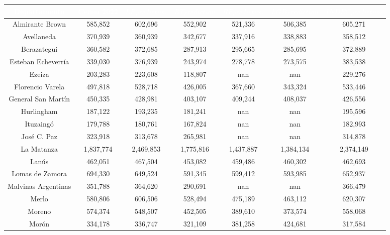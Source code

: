 \begin{table}[htb]
\centering
\begin{tabular}{|c|c|c|c|c|c|c|}
\hline
\textbf{\cellcolor[rgb]{0,0.231,0.427}\textcolor{white}{Departamento}} & \textbf{\cellcolor[rgb]{0,0.231,0.427}\textcolor{white}{Censo 2022}} & \textbf{\cellcolor[rgb]{0,0.231,0.427}\textcolor{white}{$LR_Prediction$}} & \textbf{\cellcolor[rgb]{0,0.231,0.427}\textcolor{white}{$RT_Prediction$}} & \textbf{\cellcolor[rgb]{0,0.231,0.427}\textcolor{white}{$RF_Prediction$}} & \textbf{\cellcolor[rgb]{0,0.231,0.427}\textcolor{white}{$LGB_Prediction$}} & \textbf{\cellcolor[rgb]{0,0.231,0.427}\textcolor{white}{$INDEC_Prediction$}} \\ \hline
Almirante Brown & 585,852 & 602,696 & 552,902 & 521,336 & 506,385 & 605,271 \\
Avellaneda & 370,939 & 360,939 & 342,677 & 337,916 & 338,883 & 358,512 \\
Berazategui & 360,582 & 372,685 & 287,913 & 295,665 & 285,695 & 372,889 \\
Esteban Echeverría & 339,030 & 376,939 & 243,974 & 278,778 & 273,575 & 383,538 \\
Ezeiza & 203,283 & 223,608 & 118,807 & nan & nan & 229,276 \\
Florencio Varela & 497,818 & 528,718 & 426,005 & 367,660 & 343,324 & 533,446 \\
General San Martín & 450,335 & 428,981 & 403,107 & 409,244 & 408,037 & 426,556 \\
Hurlingham & 187,122 & 193,235 & 181,241 & nan & nan & 195,596 \\
Ituzaingó & 179,788 & 180,761 & 167,824 & nan & nan & 182,993 \\
José C. Paz & 323,918 & 313,678 & 265,981 & nan & nan & 314,878 \\
La Matanza & 1,837,774 & 2,469,853 & 1,775,816 & 1,437,887 & 1,384,134 & 2,374,149 \\
Lanús & 462,051 & 467,504 & 453,082 & 459,486 & 460,302 & 462,693 \\
Lomas de Zamora & 694,330 & 649,524 & 591,345 & 599,412 & 593,985 & 652,937 \\
Malvinas Argentinas & 351,788 & 364,620 & 290,691 & nan & nan & 366,479 \\
Merlo & 580,806 & 606,506 & 528,494 & 475,189 & 463,112 & 620,307 \\
Moreno & 574,374 & 548,507 & 452,505 & 389,610 & 373,574 & 558,068 \\
Morón & 334,178 & 336,747 & 321,109 & 381,258 & 424,681 & 317,584 \\

\end{tabular}
\end{table}
